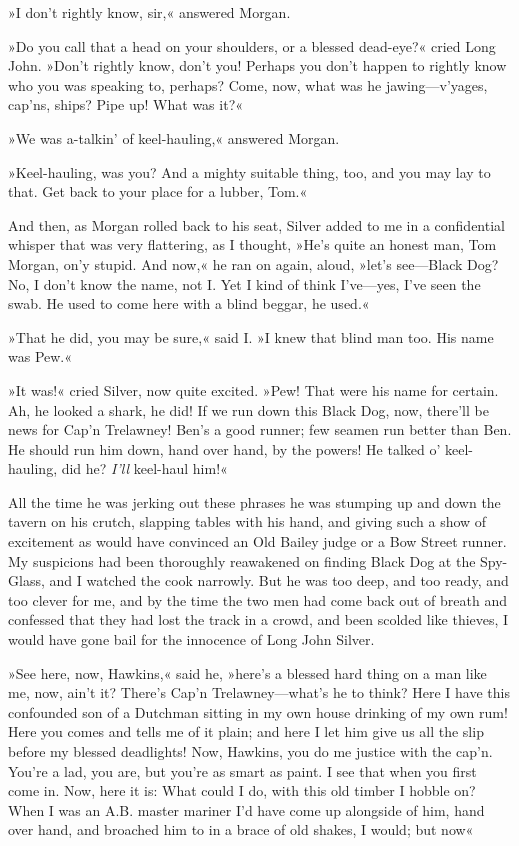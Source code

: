 »I don't rightly know, sir,« answered Morgan.

»Do you call that a head on your shoulders, or a blessed dead-eye?« cried Long John. »Don't rightly know, don't you! Perhaps you don't happen to rightly know who you was speaking to, perhaps? Come, now, what was he jawing—v'yages, cap'ns, ships? Pipe up! What was it?«

»We was a-talkin' of keel-hauling,« answered Morgan.

»Keel-hauling, was you? And a mighty suitable thing, too, and you may lay to that. Get back to your place for a lubber, Tom.«

And then, as Morgan rolled back to his seat, Silver added to me in a confidential whisper that was very flattering, as I thought, »He's quite an honest man, Tom Morgan, on'y stupid. And now,« he ran on again, aloud, »let's see—Black Dog? No, I don't know the name, not I. Yet I kind of think I've—yes, I've seen the swab. He used to come here with a blind beggar, he used.«

»That he did, you may be sure,« said I. »I knew that blind man too. His name was Pew.«

»It was!« cried Silver, now quite excited. »Pew! That were his name for certain. Ah, he looked a shark, he did! If we run down this Black Dog, now, there'll be news for Cap'n Trelawney! Ben's a good runner; few seamen run better than Ben. He should run him down, hand over hand, by the powers! He talked o' keel-hauling, did he? \textit{I'll} keel-haul him!«

All the time he was jerking out these phrases he was stumping up and down the tavern on his crutch, slapping tables with his hand, and giving such a show of excitement as would have convinced an Old Bailey judge or a Bow Street runner. My suspicions had been thoroughly reawakened on finding Black Dog at the Spy-Glass, and I watched the cook narrowly. But he was too deep, and too ready, and too clever for me, and by the time the two men had come back out of breath and confessed that they had lost the track in a crowd, and been scolded like thieves, I would have gone bail for the innocence of Long John Silver.

»See here, now, Hawkins,« said he, »here's a blessed hard thing on a man like me, now, ain't it? There's Cap'n Trelawney—what's he to think? Here I have this confounded son of a Dutchman sitting in my own house drinking of my own rum! Here you comes and tells me of it plain; and here I let him give us all the slip before my blessed deadlights! Now, Hawkins, you do me justice with the cap'n. You're a lad, you are, but you're as smart as paint. I see that when you first come in. Now, here it is: What could I do, with this old timber I hobble on? When I was an A.B. master mariner I'd have come up alongside of him, hand over hand, and broached him to in a brace of old shakes, I would; but now\longdash«

